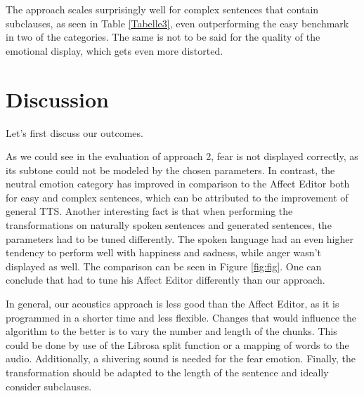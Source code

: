 \documentclass[11pt]{article}
\begin{document}
The approach scales surprisingly well for complex sentences that contain subclauses, as seen in Table \ref{Tabelle3}, even outperforming the easy benchmark in two of the categories. The same is not to be said for the quality of the emotional display, which gets even more distorted.


\section{Discussion}
\label{discussion}
Let's first discuss our outcomes.


As we could see in the evaluation of approach 2, fear is not displayed correctly, as its subtone could not be modeled by the chosen parameters. In contrast, the neutral emotion category has improved in comparison to the Affect Editor both for easy and complex sentences, which can be attributed to the improvement of general TTS. Another interesting fact is that when performing the transformations on naturally spoken sentences and generated sentences, the parameters had to be tuned differently. The spoken language had an even higher tendency to perform well with happiness and sadness, while anger wasn't displayed as well. The comparison can be seen in Figure \ref{fig:fig}. One can conclude that \cite{cahn_generation_2000} had to tune his Affect Editor differently than our approach.

In general, our acoustics approach is less good than the Affect Editor, as it is programmed in a shorter time and less flexible. Changes that would influence the algorithm to the better is to vary the number and length of the chunks. This could be done by use of the Librosa split function or a mapping of words to the audio. Additionally, a shivering sound is needed for the fear emotion. Finally, the transformation should be adapted to the length of the sentence and ideally consider subclauses.
\end{document}

